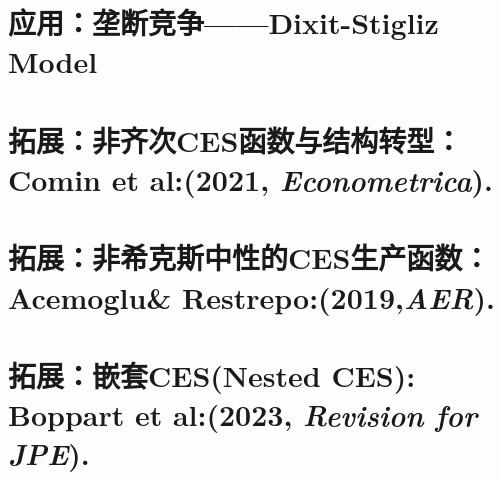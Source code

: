 \documentclass[UTF8]{ctexart}
\theoremstyle{definition}
\begin{document}
\section{应用：垄断竞争——Dixit-Stigliz Model}

\section{拓展：非齐次CES函数与结构转型：Comin et al:(2021, \textit{Econometrica}).}

\section{拓展：非希克斯中性的CES生产函数：Acemoglu\& Restrepo:(2019,\textit{AER}).}

\section{拓展：嵌套CES(Nested CES): Boppart et al:(2023, \textit{Revision for JPE}).}
%
\end{document}
